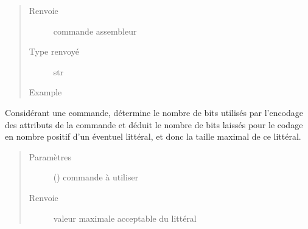 \documentclass[letterpaper,10pt,french]{sphinxmanual}
\begin{document}
\begin{fulllineitems}
\begin{fulllineitems}
\begin{quote}
\begin{description}
\item[{Renvoie}] \leavevmode
commande assembleur

\item[{Type renvoyé}] \leavevmode
str

\item[{Example}] \leavevmode
\begin{sphinxVerbatim}[commandchars=\\\{\}]
\end{sphinxVerbatim}

\begin{sphinxVerbatim}[commandchars=\\\{\}]
\end{sphinxVerbatim}

\end{description}\end{quote}

\end{fulllineitems}


\begin{fulllineitems}
\label{\detokenize{processorengine:processorengine.ProcessorEngine.getLitteralMaxSizeIn}}
Considérant une commande, détermine le nombre de bits utilisés par l’encodage des attributs de la commande et déduit le nombre de bits laissés pour le codage en nombre positif d’un éventuel littéral, et donc la taille maximal de ce littéral.
\begin{quote}\begin{description}
\item[{Paramètres}] \leavevmode
{} () \textendash{} commande à utiliser

\item[{Renvoie}] \leavevmode
valeur maximale acceptable du littéral


\end{description}
\end{quote}
\end{fulllineitems}
\end{fulllineitems}
\end{document}
